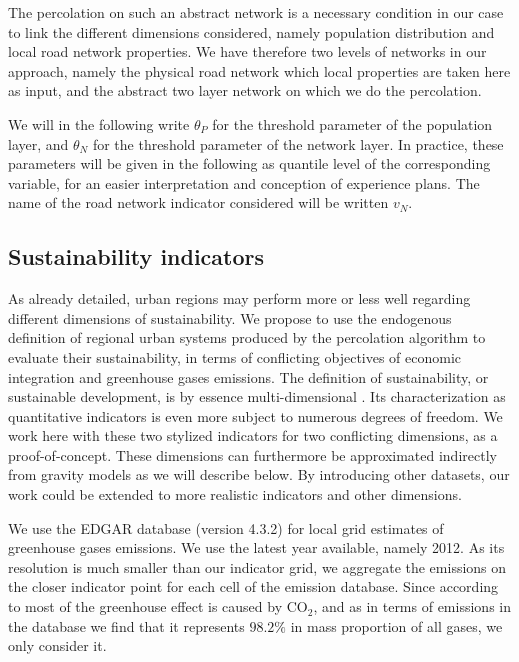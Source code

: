 \documentclass{jimis-en}
\begin{document}
The percolation on such an abstract network is a necessary condition in our case to link the different dimensions considered, namely population distribution and local road network properties. We have therefore two levels of networks in our approach, namely the physical road network which local properties are taken here as input, and the abstract two layer network on which we do the percolation.

We will in the following write $\theta_P$ for the threshold parameter of the population layer, and $\theta_N$ for the threshold parameter of the network layer. In practice, these parameters will be given in the following as quantile level of the corresponding variable, for an easier interpretation and conception of experience plans. The name of the road network indicator considered will be written $v_N$.


\subsection{Sustainability indicators}


As already detailed, urban regions may perform more or less well regarding different dimensions of sustainability. We propose to use the endogenous definition of regional urban systems produced by the percolation algorithm to evaluate their sustainability, in terms of conflicting objectives of economic integration and greenhouse gases emissions. The definition of sustainability, or sustainable development, is by essence multi-dimensional \citep{viguie2012trade}. Its characterization as quantitative indicators is even more subject to numerous degrees of freedom. We work here with these two stylized indicators for two conflicting dimensions, as a proof-of-concept. These dimensions can furthermore be approximated indirectly from gravity models as we will describe below. By introducing other datasets, our work could be extended to more realistic indicators and other dimensions.

We use the EDGAR database \citep{janssens2017edgar} (version 4.3.2) for local grid estimates of greenhouse gases emissions. We use the latest year available, namely 2012. As its resolution is much smaller than our indicator grid, we aggregate the emissions on the closer indicator point for each cell of the emission database. Since according to \cite{lashof1990relative} most of the greenhouse effect is caused by $\textrm{CO}_2$, and as in terms of emissions in the database we find that it represents $98.2\%$ in mass proportion of all gases, we only consider it.
\end{document}
